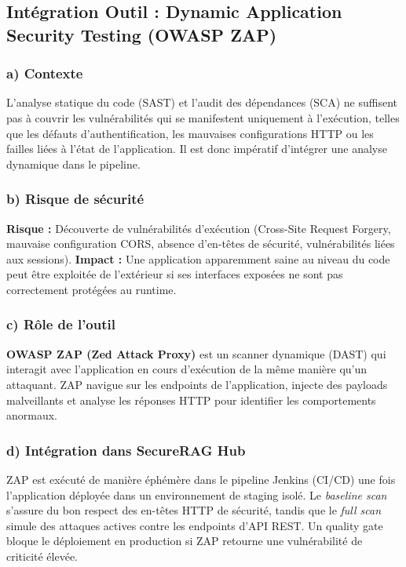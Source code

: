 \subsection{Intégration Outil : Dynamic Application Security Testing (OWASP ZAP)}

\subsubsection{a) Contexte}
L'analyse statique du code (SAST) et l'audit des dépendances (SCA) ne suffisent pas à couvrir les vulnérabilités qui se manifestent uniquement à l'exécution, telles que les défauts d'authentification, les mauvaises configurations HTTP ou les failles liées à l'état de l'application. Il est donc impératif d'intégrer une analyse dynamique dans le pipeline.

\subsubsection{b) Risque de sécurité}
\textbf{Risque :} Découverte de vulnérabilités d'exécution (Cross-Site Request Forgery, mauvaise configuration CORS, absence d'en-têtes de sécurité, vulnérabilités liées aux sessions).
\textbf{Impact :} Une application apparemment saine au niveau du code peut être exploitée de l'extérieur si ses interfaces exposées ne sont pas correctement protégées au runtime.

\subsubsection{c) Rôle de l'outil}
\textbf{OWASP ZAP (Zed Attack Proxy)} est un scanner dynamique (DAST) qui interagit avec l'application en cours d'exécution de la même manière qu'un attaquant. ZAP navigue sur les endpoints de l'application, injecte des payloads malveillants et analyse les réponses HTTP pour identifier les comportements anormaux.

\subsubsection{d) Intégration dans SecureRAG Hub}
ZAP est exécuté de manière éphémère dans le pipeline Jenkins (CI/CD) une fois l'application déployée dans un environnement de staging isolé. Le \textit{baseline scan} s'assure du bon respect des en-têtes HTTP de sécurité, tandis que le \textit{full scan} simule des attaques actives contre les endpoints d'API REST. Un quality gate bloque le déploiement en production si ZAP retourne une vulnérabilité de criticité élevée.

